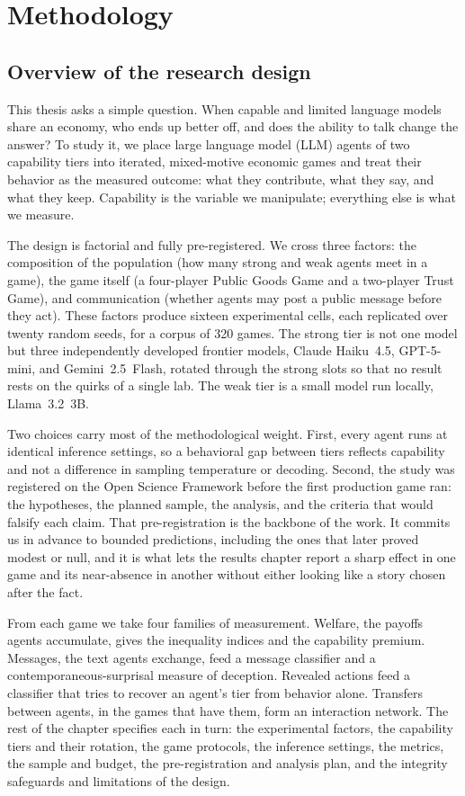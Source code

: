 \chapter{Methodology}
\label{ch:methodology}

\section{Overview of the research design}
\label{sec:overview}

This thesis asks a simple question. When capable and limited language models share an
economy, who ends up better off, and does the ability to talk change the answer? To study
it, we place large language model (LLM) agents of two capability tiers into iterated,
mixed-motive economic games and treat their behavior as the measured outcome: what they
contribute, what they say, and what they keep. Capability is the variable we manipulate;
everything else is what we measure.

The design is factorial and fully pre-registered. We cross three factors: the composition
of the population (how many strong and weak agents meet in a game), the game itself (a
four-player Public Goods Game and a two-player Trust Game), and communication (whether
agents may post a public message before they act). These factors produce sixteen
experimental cells, each replicated over twenty random seeds, for a corpus of 320 games.
The strong tier is not one model but three independently developed frontier models, Claude
Haiku~4.5, GPT-5-mini, and Gemini~2.5~Flash, rotated through the strong slots so that no
result rests on the quirks of a single lab. The weak tier is a small model run locally,
Llama~3.2~3B.

Two choices carry most of the methodological weight. First, every agent runs at identical
inference settings, so a behavioral gap between tiers reflects capability and not a
difference in sampling temperature or decoding. Second, the study was registered on the
Open Science Framework before the first production game ran: the hypotheses, the planned
sample, the analysis, and the criteria that would falsify each claim. That pre-registration
is the backbone of the work. It commits us in advance to bounded predictions, including the
ones that later proved modest or null, and it is what lets the results chapter report a
sharp effect in one game and its near-absence in another without either looking like a
story chosen after the fact.

From each game we take four families of measurement. Welfare, the payoffs agents
accumulate, gives the inequality indices and the capability premium. Messages, the text
agents exchange, feed a message classifier and a contemporaneous-surprisal measure of
deception. Revealed actions feed a classifier that tries to recover an agent's tier from
behavior alone. Transfers between agents, in the games that have them, form an
interaction network. The rest of the
chapter specifies each in turn: the experimental factors, the capability tiers and their
rotation, the game protocols, the inference settings, the metrics, the sample and budget,
the pre-registration and analysis plan, and the integrity safeguards and limitations of
the design.

